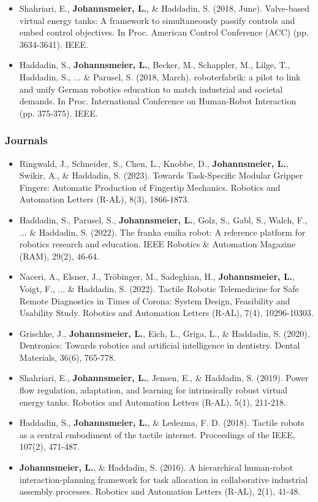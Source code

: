 \begin{itemize}
    \item Shahriari, E., \textbf{Johannsmeier, L.}, \& Haddadin, S. (2018, June). Valve-based virtual energy tanks: A framework to simultaneously passify controls and embed control objectives. In Proc. American Control Conference (ACC) (pp. 3634-3641). IEEE.
    \item Haddadin, S., \textbf{Johannsmeier, L.}, Becker, M., Schappler, M., Lilge, T., Haddadin, S., ... \& Parusel, S. (2018, March). roboterfabrik: a pilot to link and unify German robotics education to match industrial and societal demands. In Proc. International Conference on Human-Robot Interaction (pp. 375-375). IEEE.
\end{itemize}

\subsubsection*{Journals}
\begin{itemize}
    \item Ringwald, J., Schneider, S., Chen, L., Knobbe, D., \textbf{Johannsmeier, L.}, Swikir, A., \& Haddadin, S. (2023). Towards Task-Specific Modular Gripper Fingers: Automatic Production of Fingertip Mechanics. Robotics and Automation Letters (R-AL), 8(3), 1866-1873.
    \item Haddadin, S., Parusel, S., \textbf{Johannsmeier, L.}, Golz, S., Gabl, S., Walch, F., ... \& Haddadin, S. (2022). The franka emika robot: A reference platform for robotics research and education. IEEE Robotics \& Automation Magazine (RAM), 29(2), 46-64.
    \item Naceri, A., Elsner, J., Tr\"obinger, M., Sadeghian, H., \textbf{Johannsmeier, L.}, Voigt, F., ... \& Haddadin, S. (2022). Tactile Robotic Telemedicine for Safe Remote Diagnostics in Times of Corona: System Design, Feasibility and Usability Study. Robotics and Automation Letters (R-AL), 7(4), 10296-10303.
    \item Grischke, J., \textbf{Johannsmeier, L.}, Eich, L., Griga, L., \& Haddadin, S. (2020). Dentronics: Towards robotics and artificial intelligence in dentistry. Dental Materials, 36(6), 765-778.
    \item Shahriari, E., \textbf{Johannsmeier, L.}, Jensen, E., \& Haddadin, S. (2019). Power flow regulation, adaptation, and learning for intrinsically robust virtual energy tanks. Robotics and Automation Letters (R-AL), 5(1), 211-218.
    \item Haddadin, S., \textbf{Johannsmeier, L.}, \& Ledezma, F. D. (2018). Tactile robots as a central embodiment of the tactile internet. Proceedings of the IEEE, 107(2), 471-487.
    \item \textbf{Johannsmeier, L.}, \& Haddadin, S. (2016). A hierarchical human-robot interaction-planning framework for task allocation in collaborative industrial assembly processes. Robotics and Automation Letters (R-AL), 2(1), 41-48.
\end{itemize}

